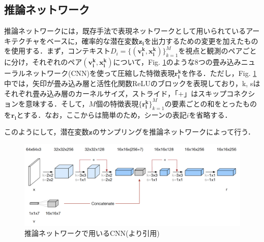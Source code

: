 \subsection{推論ネットワーク}
推論ネットワークには，既存手法で表現ネットワークとして用いられているアーキテクチャをベースに，確率的な潜在変数$\bm{z_i}$を出力するための変更を加えたものを使用する．まず，コンテキスト$D_i = \{ (\bm{ v _ { i } ^ { k } }, \bm{x _ { i } ^ { k } }) \} _ { k = 1 } ^ { M }$を視点と観測のペアごとに分け，それぞれのペア$(\bm{ v _ { i } ^ { k } }, \bm{x _ { i } ^ { k } })$について，Fig. \ref{fig:inference_network}のような8つの畳み込みニューラルネットワーク(CNN)を使って圧縮した特徴表現$\bm{r_i^k}$を作る．ただし，Fig. \ref{fig:inference_network}中では，矢印が畳み込み層と活性化関数ReLUのブロックを表現しており，k, sはそれぞれ畳み込み層のカーネルサイズ，ストライド，「+」はスキップコネクション\cite{ResNet}を意味する．そして，$M$個の特徴表現${\{\bm{r_i^k}\}}_{ k = 1 } ^ { M }$の要素ごとの和をとったものを$\bm{r_i}$とする．なお，ここからは簡単のため，シーンの表記$i$を省略する．


このようにして，潜在変数$\bm{z}$のサンプリングを推論ネットワークによって行う．

\begin{figure}[tbp]
  \begin{center}
    \includegraphics[width=\linewidth]{./figures/representation_network.png}
    \caption{推論ネットワークで用いるCNN(\cite{Eslami2018}より引用)}
    \label{fig:inference_network}
  \end{center}
\end{figure}

